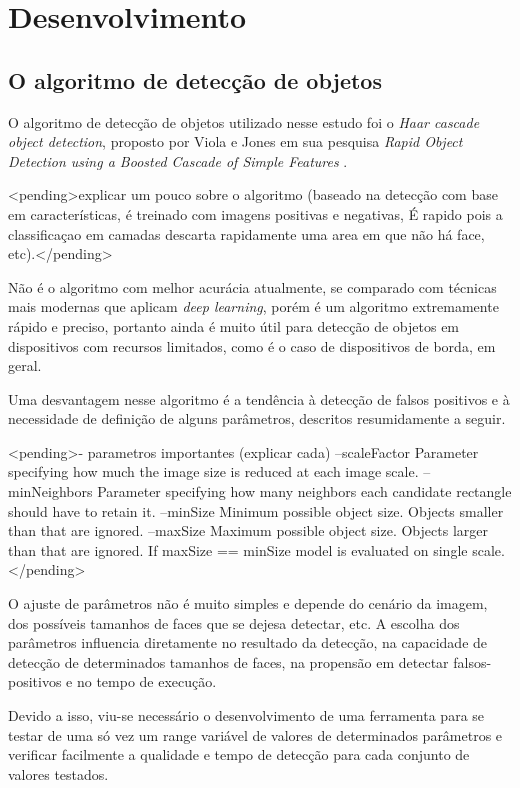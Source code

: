 \chapter{Desenvolvimento}
\thispagestyle{plain}
\label{cap:desenvolvimento}
\graphicspath{{./Cap3_Desenvolvimento/Figures/}}

\section{O algoritmo de detecção de objetos}

O algoritmo de detecção de objetos utilizado nesse estudo foi o \textit{Haar cascade object detection}, proposto por Viola e Jones em sua pesquisa \textit{Rapid Object Detection using a Boosted Cascade of Simple Features} \cite{Viola2001}.

<pending>explicar um pouco sobre o algoritmo (baseado na detecção com base em características, é treinado com imagens positivas e negativas, É rapido pois a classificaçao em camadas descarta rapidamente uma area em que não há face, etc).</pending>

Não é o algoritmo com melhor acurácia atualmente, se comparado com técnicas mais modernas que aplicam \textit{deep learning}, porém é um algoritmo extremamente rápido e preciso, portanto ainda é muito útil para detecção de objetos em dispositivos com recursos limitados, como é o caso de dispositivos de borda, em geral.

Uma desvantagem nesse algoritmo é a tendência à detecção de falsos positivos e à necessidade de definição de alguns parâmetros, descritos resumidamente a seguir.

<pending>- parametros importantes (explicar cada)
--scaleFactor	Parameter specifying how much the image size is reduced at each image scale.
--minNeighbors	Parameter specifying how many neighbors each candidate rectangle should have to retain it.
--minSize	Minimum possible object size. Objects smaller than that are ignored.
--maxSize	Maximum possible object size. Objects larger than that are ignored. If maxSize == minSize model is evaluated on single scale.</pending>

O ajuste de parâmetros não é muito simples e depende do cenário da imagem, dos possíveis tamanhos de faces que se dejesa detectar, etc. A escolha dos parâmetros influencia diretamente no resultado da detecção, na capacidade de detecção de determinados tamanhos de faces, na propensão em detectar falsos-positivos e no tempo de execução.

Devido a isso, viu-se necessário o desenvolvimento de uma ferramenta para se testar de uma só vez um range variável de valores de determinados parâmetros e verificar facilmente a qualidade e tempo de detecção para cada conjunto de valores testados. 


